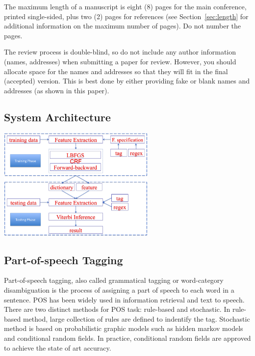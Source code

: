 \documentclass[11pt,letterpaper]{article}
\begin{document}
The maximum length of a manuscript is eight (8) pages for the main
conference, printed single-sided, plus two (2) pages for references
(see Section~\ref{sec:length} for additional information on the
maximum number of pages).  Do not number the pages.

The review process is double-blind, so do not include any author information (names, addresses) when submitting a paper for review.  However, you should allocate space for the names and addresses so that they will fit in the final (accepted) version.  This is best done by either providing fake or blank names and addresses (as shown in this paper).
\subsection{System Architecture}
\begin{center}
\includegraphics[height=15em]{system.png}
\end{center}

\subsection{Part-of-speech Tagging}
Part-of-speech tagging, also called grammatical tagging or word-category disambiguation is the process of assigning 
a part of speech to each word in a sentence. POS has been widely used in information retrieval and text to speech. 
There are two distinct methods for 
POS task: rule-based and stochastic.
In rule-based method, large collection of rules are defined to indentify the tag. Stochastic method is based on 
probabilistic graphic models such as hidden markov models and conditional random fields. In practice, 
conditional random fields are approved to achieve the state of art accuracy.
\end{document}
